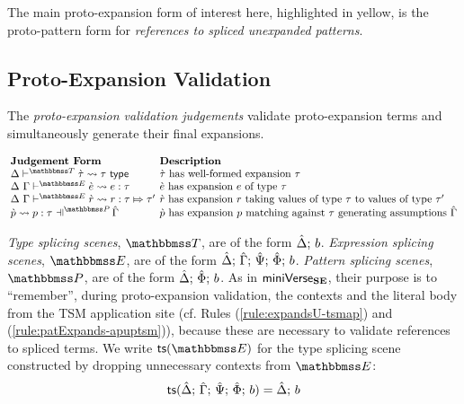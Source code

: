{{{{The main proto-expansion form of interest here, highlighted in yellow, is the proto-pattern form for \emph{references to spliced unexpanded patterns}.


\subsection{Proto-Expansion Validation}\label{sec:ce-validation-UP}
The \emph{proto-expansion validation judgements} validate proto-expansion terms and simultaneously generate their final expansions.

\vspace{10px}\noindent$\arraycolsep=2pt\begin{array}{ll}
\textbf{Judgement Form} & \textbf{Description}\\
\cvalidT{\Delta}{\tscenev}{\ctau}{\tau} & \text{$\ctau$ has well-formed expansion $\tau$}\\
\cvalidE{\Delta}{\Gamma}{\escenev}{\ce}{e}{\tau} & \text{$\ce$ has expansion $e$ of type $\tau$}\\
\cvalidR{\Delta}{\Gamma}{\escenev}{\crv}{r}{\tau}{\tau'} & \text{$\crv$ has expansion $r$ taking values of type $\tau$ to values of type $\tau'$}\\
\cvalidP{\upctx}{\pscenev}{\cpv}{p}{\tau} & \text{$\cpv$ has expansion $p$ matching against $\tau$ generating assumptions $\upctx$}
\end{array}$\vspace{10px}

\emph{Type splicing scenes}, $\tscenev$, are of the form $\hat{\Delta};\,b$. \emph{Expression splicing scenes}, $\escenev$, are of the form $\hat{\Delta};\,\hat{\Gamma};\,\hat{\Psi};\,\hat\Phi;\,b$. \emph{Pattern splicing scenes}, $\pscenev$, are of the form $\hat{\Delta};\,\hat\Phi;\,b$. As in $\mathsf{miniVerse}_\textbf{SE}$, their purpose is to ``remember'', during proto-expansion validation, the contexts and the literal body from the TSM application site (cf. Rules (\ref{rule:expandsU-tsmap}) and (\ref{rule:patExpands-apuptsm})), because these are necessary to validate references to spliced terms. We write $\tsfrom{\escenev}$ for the type splicing scene constructed by dropping unnecessary contexts from $\escenev$:
\[\mathsf{ts}(\hat{\Delta};\,\hat{\Gamma};\,\hat{\Psi};\,\hat\Phi;\,b) = \hat{\Delta};\,b\]

}}}}
